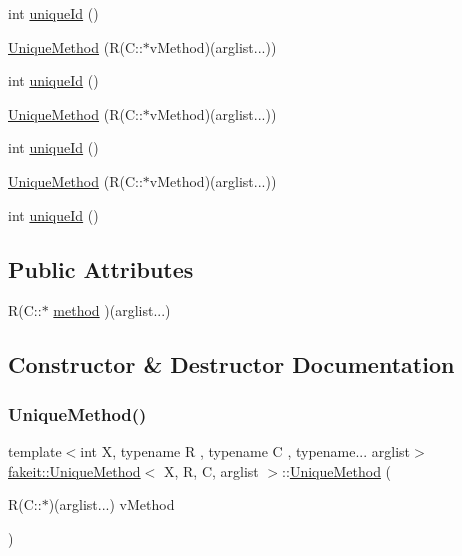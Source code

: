\begin{DoxyCompactItemize}
\item 
int \mbox{\hyperlink{structfakeit_1_1UniqueMethod_a9a7108ad7e5700aa48417deb30c1e2b5}{unique\+Id}} ()
\item 
\mbox{\hyperlink{structfakeit_1_1UniqueMethod_ac875b964e9c0b91d8a8b5fd4363d9f20}{Unique\+Method}} (R(C\+::$\ast$v\+Method)(arglist...))
\item 
int \mbox{\hyperlink{structfakeit_1_1UniqueMethod_a9a7108ad7e5700aa48417deb30c1e2b5}{unique\+Id}} ()
\item 
\mbox{\hyperlink{structfakeit_1_1UniqueMethod_ac875b964e9c0b91d8a8b5fd4363d9f20}{Unique\+Method}} (R(C\+::$\ast$v\+Method)(arglist...))
\item 
int \mbox{\hyperlink{structfakeit_1_1UniqueMethod_a9a7108ad7e5700aa48417deb30c1e2b5}{unique\+Id}} ()
\item 
\mbox{\hyperlink{structfakeit_1_1UniqueMethod_ac875b964e9c0b91d8a8b5fd4363d9f20}{Unique\+Method}} (R(C\+::$\ast$v\+Method)(arglist...))
\item 
int \mbox{\hyperlink{structfakeit_1_1UniqueMethod_a9a7108ad7e5700aa48417deb30c1e2b5}{unique\+Id}} ()
\end{DoxyCompactItemize}
\subsection*{Public Attributes}
\begin{DoxyCompactItemize}
\item 
R(C\+::$\ast$ \mbox{\hyperlink{structfakeit_1_1UniqueMethod_a9a9bbeb25dfb6444f9e837bec892c3c1}{method}} )(arglist...)
\end{DoxyCompactItemize}


\subsection{Constructor \& Destructor Documentation}
\mbox{\label{structfakeit_1_1UniqueMethod_ac875b964e9c0b91d8a8b5fd4363d9f20}} 
\subsubsection{\texorpdfstring{UniqueMethod()}{UniqueMethod()}\hspace{0.1cm}{\footnotesize\ttfamily [1/9]}}
{\footnotesize\ttfamily template$<$int X, typename R , typename C , typename... arglist$>$ \\
\mbox{\hyperlink{structfakeit_1_1UniqueMethod}{fakeit\+::\+Unique\+Method}}$<$ X, R, C, arglist $>$\+::\mbox{\hyperlink{structfakeit_1_1UniqueMethod}{Unique\+Method}} (\begin{DoxyParamCaption}\item[{R(C\+::$\ast$)(arglist...)}]{v\+Method }\end{DoxyParamCaption})\hspace{0.3cm}{\ttfamily [inline]}}


